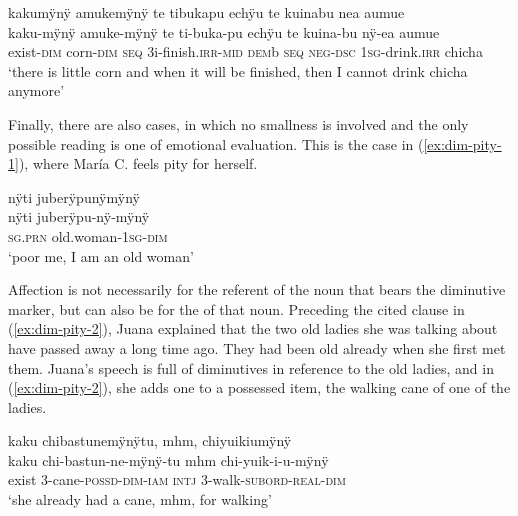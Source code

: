 \ea\label{ex:dim-small-amount}
\begingl 
\glpreamble kakumÿnÿ amukemÿnÿ te tibukapu echÿu te kuinabu nea aumue\\
\gla kaku-mÿnÿ amuke-mÿnÿ te ti-buka-pu echÿu te kuina-bu nÿ-ea aumue\\ 
\glb exist-\textsc{dim} corn-\textsc{dim} \textsc{seq} 3i-finish.\textsc{irr}-\textsc{mid} \textsc{dem}b \textsc{seq} \textsc{neg}-\textsc{dsc} 1\textsc{sg}-drink.\textsc{irr} chicha\\ 
\glft ‘there is little corn and when it will be finished, then I cannot drink chicha anymore’\\ 
\endgl
\trailingcitation{[ump-p110815sf.693]}
\xe

Finally, there are also cases, in which no smallness is involved and the only possible reading is one of emotional evaluation. This is the case in (\ref{ex:dim-pity-1}), where María C. feels pity for herself.

\ea\label{ex:dim-pity-1}
\begingl 
\glpreamble nÿti juberÿpunÿmÿnÿ\\
\gla nÿti juberÿpu-nÿ-mÿnÿ\\ 
\textsc{sg.prn} old.woman-1\textsc{sg}-\textsc{dim}\\ 
\glft ‘poor me, I am an old woman’\\ 
\endgl
\trailingcitation{[uxx-p110825l.038]}
\xe

Affection is not necessarily for the referent of the noun that bears the diminutive marker, but can also be for the  of that noun. Preceding the cited clause in (\ref{ex:dim-pity-2}), Juana explained that the two old ladies she was talking about have passed away a long time ago. They had been old already when she first met them. Juana’s speech is full of diminutives in reference to the old ladies, and in (\ref{ex:dim-pity-2}), she adds one to a possessed item, the walking cane of one of the ladies.

\ea\label{ex:dim-pity-2}
\begingl 
\glpreamble kaku chibastunemÿnÿtu, mhm, chiyuikiumÿnÿ\\
\gla kaku chi-bastun-ne-mÿnÿ-tu mhm chi-yuik-i-u-mÿnÿ\\ 
\glb exist 3-cane-\textsc{possd}-\textsc{dim}-\textsc{iam} \textsc{intj} 3-walk-\textsc{subord}-\textsc{real}-\textsc{dim}\\ 
\glft ‘she already had a cane, mhm, for walking’\\ 
\endgl
\trailingcitation{[jxx-p120515l-1.220-221]}
\xe




